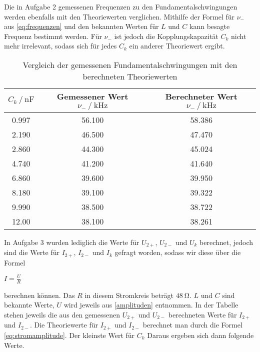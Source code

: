 Die in Aufgabe 2 gemessenen Frequenzen zu den Fundamentalschwingungen werden ebenfalls mit den Theoriewerten verglichen. Mithilfe der Formel für $\nu _-$ aus \autoref{eq:frequenzen} und den bekannten Werten für $L$ und $C$ kann besagte Frequenz bestimmt werden. Für $\nu_-$ ist jedoch die Kopplungskapazität $C_k$ nicht mehr irrelevant, sodass sich für jedes $C_k$ ein anderer Theoriewert ergibt.

\begin{table}
  \centering
  \caption{Vergleich der gemessenen Fundamentalschwingungen mit den berechneten Theoriewerten}
  \label{tab:schwingung}
  \begin{tabular}{c c c}
    \toprule 
    $C_k \:/\: \si{\nano\farad}$ & Gemessener Wert $\nu _- \:/\: \si{\kilo\hertz}$ & Berechneter Wert $\nu _- \:/\: \si{\kilo\hertz}$    \\ 
    \midrule 
    0.997 & 56.100 & 58.386 \\
    2.190 & 46.500 & 47.470 \\
    2.860 & 44.300 & 45.024 \\
    4.740 & 41.200 & 41.640 \\
    6.860 & 39.600 & 39.950 \\
    8.180 & 39.100 & 39.322 \\
    9.990 & 38.500 & 38.722 \\
    12.00 & 38.100 & 38.261 \\
    \bottomrule
  \end{tabular}
\end{table}

In Aufgabe 3 wurden lediglich die Werte für $U_{2+}$, $U_{2-}$ und $U_k$ berechnet, jedoch sind die Werte für $I_{2+}$, $I_{2-}$ und $I_k$ gefragt worden, sodass wir diese über die Formel

$I = \frac{U}{R}$

berechnen können. Das $R$ in diesem Stromkreis beträgt $\SI{48}{\ohm}$. $L$ und $C$ sind bekannte Werte, $U$ wird jeweils aus \autoref{amplituden} entnommen. In der Tabelle stehen jeweils die aus den gemessenen $U_{2+}$ und $U_{2-}$ berechneten Werte für $I_{2+}$ und $I_{2-}$. Die Theoriewerte für $I_{2+}$ und $I_{2-}$ berechnet man durch die Formel \autoref{eq:stromamplitude}. Der kleinste Wert für $C_k$ Daraus ergeben sich dann folgende Werte.

